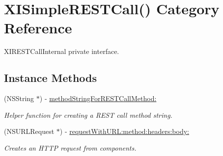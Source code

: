 \hypertarget{category_x_i_simple_r_e_s_t_call_07_08}{}\section{X\+I\+Simple\+R\+E\+S\+T\+Call() Category Reference}
\label{category_x_i_simple_r_e_s_t_call_07_08}


X\+I\+R\+E\+S\+T\+Call\+Internal private interface.  


\subsection*{Instance Methods}
\begin{DoxyCompactItemize}
\item 
(N\+S\+String $\ast$) -\/ \hyperlink{category_x_i_simple_r_e_s_t_call_07_08_ad1cad88893cef3f2437547a390239c09}{method\+String\+For\+R\+E\+S\+T\+Call\+Method\+:}
\begin{DoxyCompactList}\small\item\em Helper function for creating a R\+E\+ST call method string. \end{DoxyCompactList}\item 
(N\+S\+U\+R\+L\+Request $\ast$) -\/ \hyperlink{category_x_i_simple_r_e_s_t_call_07_08_a263c210c47255d82bb27c47b5babd20e}{request\+With\+U\+R\+L\+:method\+:headers\+:body\+:}
\begin{DoxyCompactList}\small\item\em Creates an H\+T\+TP request from components. \end{DoxyCompactList}\end{DoxyCompactItemize}
